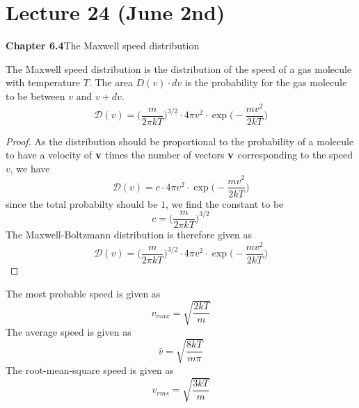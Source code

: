 \section{Lecture 24 (June 2nd)}
{\bf Chapter 6.4}\hspace{2ex}The Maxwell speed distribution
\newline
\begin{defi}
The Maxwell speed distribution is the distribution of the speed of a gas molecule with temperature $T$. The area $D(v)\cdot dv$ is the probability for the gas molecule to be between $v$ and $v+dv$. 
\[\mathcal{D}(v)=\Big(\dfrac{m}{2\pi kT}\Big)^{3/2}\cdot 4\pi v ^2\cdot \exp \Big(-\dfrac{mv ^2}{2kT}\Big)\]
\end{defi}
\vspace{2ex}
\begin{proof}
As the distribution should be proportional to the probability of a molecule to have a velocity of ${\bf v}$ times the number of vectors ${\bf v}$ corresponding to the speed $v$, we have
\[\mathcal{D}(v)=c\cdot 4\pi v^2\cdot \exp \Big(-\dfrac{mv ^2}{2kT}\Big)\]
since the total probabilty should be $1$, we find the constant to be
\[c=\Big(\dfrac{m}{2\pi kT}\Big)^{3/2}\]
The Maxwell-Boltzmann distribution is therefore given as
\[\mathcal{D}(v)=\Big(\dfrac{m}{2\pi kT}\Big)^{3/2}\cdot 4\pi v ^2\cdot \exp \Big(-\dfrac{mv ^2}{2kT}\Big)\]
\end{proof}
\vspace{2ex}
\begin{cor}
The most probable speed is given as
\[v_{max}=\sqrt{\dfrac{2kT}{m}}\]
The average speed is given as
\[\bar{v}=\sqrt{\dfrac{8kT}{m\pi }}\]
The root-mean-square speed is given as
\[v_{rms}=\sqrt{\dfrac{3kT}{m}}\]
\end{cor}
\vspace{2ex}

